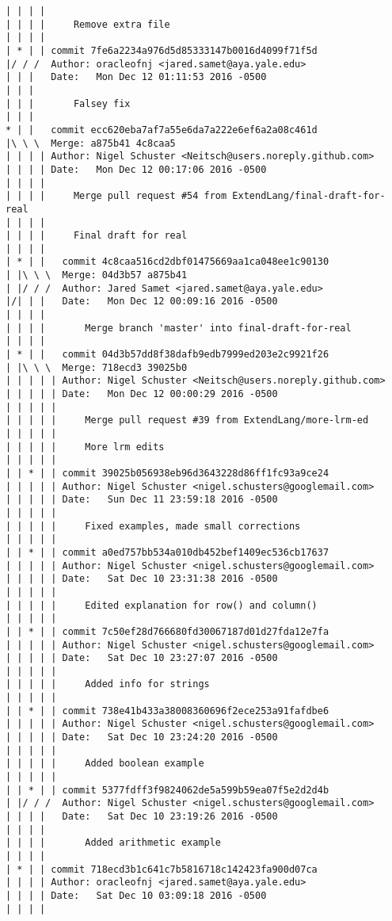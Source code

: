 \begin{lstlisting}
| | | | 
| | | |     Remove extra file
| | | |     
| * | | commit 7fe6a2234a976d5d85333147b0016d4099f71f5d
|/ / /  Author: oracleofnj <jared.samet@aya.yale.edu>
| | |   Date:   Mon Dec 12 01:11:53 2016 -0500
| | |   
| | |       Falsey fix
| | |      
* | |   commit ecc620eba7af7a55e6da7a222e6ef6a2a08c461d
|\ \ \  Merge: a875b41 4c8caa5
| | | | Author: Nigel Schuster <Neitsch@users.noreply.github.com>
| | | | Date:   Mon Dec 12 00:17:06 2016 -0500
| | | | 
| | | |     Merge pull request #54 from ExtendLang/final-draft-for-real
| | | |     
| | | |     Final draft for real
| | | |       
| * | |   commit 4c8caa516cd2dbf01475669aa1ca048ee1c90130
| |\ \ \  Merge: 04d3b57 a875b41
| |/ / /  Author: Jared Samet <jared.samet@aya.yale.edu>
|/| | |   Date:   Mon Dec 12 00:09:16 2016 -0500
| | | |   
| | | |       Merge branch 'master' into final-draft-for-real
| | | |       
| * | |   commit 04d3b57dd8f38dafb9edb7999ed203e2c9921f26
| |\ \ \  Merge: 718ecd3 39025b0
| | | | | Author: Nigel Schuster <Neitsch@users.noreply.github.com>
| | | | | Date:   Mon Dec 12 00:00:29 2016 -0500
| | | | | 
| | | | |     Merge pull request #39 from ExtendLang/more-lrm-ed
| | | | |     
| | | | |     More lrm edits
| | | | |      
| | * | | commit 39025b056938eb96d3643228d86ff1fc93a9ce24
| | | | | Author: Nigel Schuster <nigel.schusters@googlemail.com>
| | | | | Date:   Sun Dec 11 23:59:18 2016 -0500
| | | | | 
| | | | |     Fixed examples, made small corrections
| | | | |      
| | * | | commit a0ed757bb534a010db452bef1409ec536cb17637
| | | | | Author: Nigel Schuster <nigel.schusters@googlemail.com>
| | | | | Date:   Sat Dec 10 23:31:38 2016 -0500
| | | | | 
| | | | |     Edited explanation for row() and column()
| | | | |      
| | * | | commit 7c50ef28d766680fd30067187d01d27fda12e7fa
| | | | | Author: Nigel Schuster <nigel.schusters@googlemail.com>
| | | | | Date:   Sat Dec 10 23:27:07 2016 -0500
| | | | | 
| | | | |     Added info for strings
| | | | |      
| | * | | commit 738e41b433a38008360696f2ece253a91fafdbe6
| | | | | Author: Nigel Schuster <nigel.schusters@googlemail.com>
| | | | | Date:   Sat Dec 10 23:24:20 2016 -0500
| | | | | 
| | | | |     Added boolean example
| | | | |      
| | * | | commit 5377fdff3f9824062de5a599b59ea07f5e2d2d4b
| |/ / /  Author: Nigel Schuster <nigel.schusters@googlemail.com>
| | | |   Date:   Sat Dec 10 23:19:26 2016 -0500
| | | |   
| | | |       Added arithmetic example
| | | |     
| * | | commit 718ecd3b1c641c7b5816718c142423fa900d07ca
| | | | Author: oracleofnj <jared.samet@aya.yale.edu>
| | | | Date:   Sat Dec 10 03:09:18 2016 -0500
| | | | 

\end{lstlisting}
